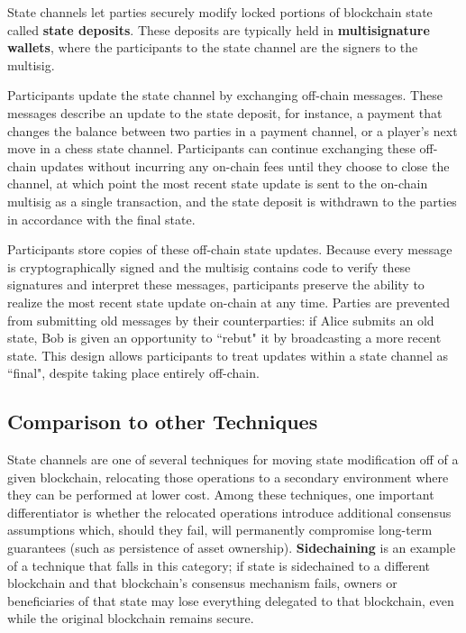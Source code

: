 \documentclass[prb,floatfix,reprint,nofootinbib,amsmath,amssymb,epsfig,pre,floats,letterpaper,groupedaffiliation,tightenlines,allcolors=blue,11pt]{revtex4}
\theoremstyle{definition}
\theoremstyle{definition}
\theoremstyle{definition}
\begin{document}
State channels let parties securely modify locked portions of blockchain state called \textbf{state deposits}. These deposits are typically held in \textbf{multisignature wallets}, where the participants to the state channel are the signers to the multisig.

Participants update the state channel by exchanging off-chain messages. These messages describe an update to the state deposit, for instance, a payment that changes the balance between two parties in a payment channel, or a player's next move in a chess state channel. Participants can continue exchanging these off-chain updates without incurring any on-chain fees until they choose to close the channel, at which point the most recent state update is sent to the on-chain multisig as a single transaction, and the state deposit is withdrawn to the parties in accordance with the final state.

Participants store copies of these off-chain state updates. Because every message is cryptographically signed and the multisig contains code to verify these signatures and interpret these messages, participants preserve the ability to realize the most recent state update on-chain at any time. Parties are prevented from submitting old messages by their counterparties: if Alice submits an old state, Bob is given an opportunity to ``rebut" it by broadcasting a more recent state. This design allows participants to treat updates within a state channel as ``final", despite taking place entirely off-chain.

\subsection{Comparison to other Techniques}

State channels are one of several techniques for moving state modification off of a given blockchain, relocating those operations to a secondary environment where they can be performed at lower cost. Among these techniques, one important differentiator is whether the relocated operations introduce additional consensus assumptions which, should they fail, will permanently compromise long-term guarantees (such as persistence of asset ownership). \textbf{Sidechaining} \cite{Back_2014} is an example of a technique that falls in this category; if state is sidechained to a different blockchain and that blockchain's consensus mechanism fails, owners or beneficiaries of that state may lose everything delegated to that blockchain, even while the original blockchain remains secure.
\end{document}
